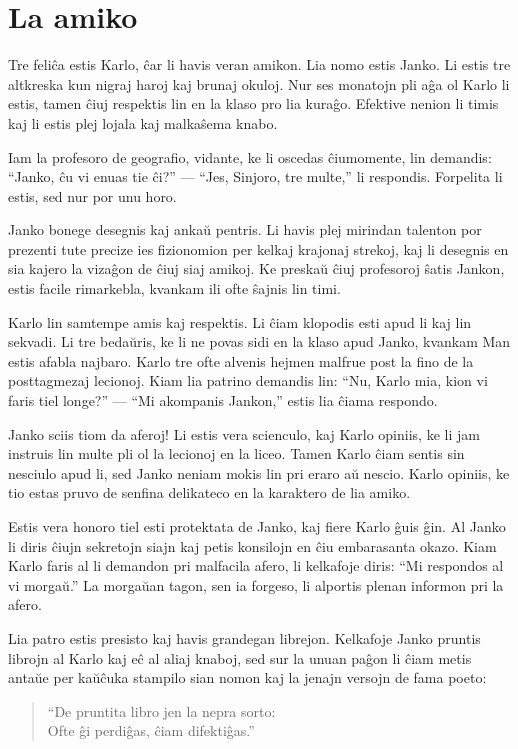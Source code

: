 \chapter{La amiko}

Tre feliĉa estis Karlo, ĉar li havis veran amikon. Lia nomo estis Janko. Li estis tre altkreska kun nigraj haroj kaj brunaj okuloj. Nur ses monatojn pli aĝa ol Karlo li estis, tamen ĉiuj respektis lin en la klaso pro lia kuraĝo. Efektive nenion li timis kaj li estis plej lojala kaj malkaŝema knabo.

Iam la profesoro de geografio, vidante, ke li oscedas ĉiumomente, lin demandis: ``Janko, ĉu vi enuas tie ĉi?'' --- ``Jes, Sinjoro, tre multe,'' li respondis. Forpelita li estis, sed nur por unu horo.

Janko bonege desegnis kaj ankaŭ pentris. Li havis plej mirindan talenton por prezenti tute precize ies fizionomion per kelkaj krajonaj strekoj, kaj li desegnis en sia kajero la vizaĝon de ĉiuj siaj amikoj. Ke preskaŭ ĉiuj profesoroj ŝatis Jankon, estis facile rimarkebla, kvankam ili ofte ŝajnis lin timi.

Karlo lin samtempe amis kaj respektis. Li ĉiam klopodis esti apud li kaj lin sekvadi. Li tre bedaŭris, ke li ne povas sidi en la klaso apud Janko, kvankam Man estis afabla najbaro. Karlo tre ofte alvenis hejmen malfrue post la fino de la posttagmezaj lecionoj. Kiam lia patrino demandis lin: ``Nu, Karlo mia, kion vi faris tiel longe?'' --- ``Mi akompanis Jankon,'' estis lia ĉiama respondo.

Janko sciis tiom da aferoj! Li estis vera scienculo, kaj Karlo opiniis, ke li jam instruis lin multe pli ol la lecionoj en la liceo. Tamen Karlo ĉiam sentis sin nesciulo apud li, sed Janko neniam mokis lin pri eraro aŭ nescio. Karlo opiniis, ke tio estas pruvo de senfina delikateco en la karaktero de lia amiko.

Estis vera honoro tiel esti protektata de Janko, kaj fiere Karlo ĝuis ĝin. Al Janko li diris ĉiujn sekretojn siajn kaj petis konsilojn en ĉiu embarasanta okazo. Kiam Karlo faris al li demandon pri malfacila afero, li kelkafoje diris: ``Mi respondos al vi morgaŭ.'' La morgaŭan tagon, sen ia forgeso, li alportis plenan informon pri la afero.

Lia patro estis presisto kaj havis grandegan librejon. Kelkafoje Janko pruntis librojn al Karlo kaj eĉ al aliaj knaboj, sed sur la unuan paĝon li ĉiam metis antaŭe per kaŭĉuka stampilo sian nomon kaj la jenajn versojn de fama poeto:

\begin{quotation}
    \noindent ``De pruntita libro jen la nepra sorto:\\
    Ofte ĝi perdiĝas, ĉiam difektiĝas.''
\end{quotation}

